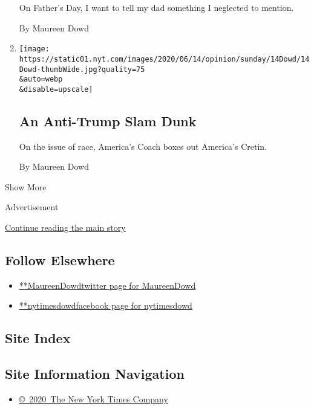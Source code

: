 \begin{enumerate}
  On Father's Day, I want to tell my dad something I neglected to
  mention.

  By Maureen Dowd
\item
  \href{/2020/06/13/opinion/sunday/gregg-popovich-trump-nba-protests.html}{}

  \texttt{[image: https://static01.nyt.com/images/2020/06/14/opinion/sunday/14Dowd/14Dowd-thumbWide.jpg?quality=75\\\&auto=webp\\\&disable=upscale]}

  \hypertarget{an-anti-trump-slam-dunk}{%
  \subsection{An Anti-Trump Slam Dunk}\label{an-anti-trump-slam-dunk}}

  On the issue of race, America's Coach boxes out America's Cretin.

  By Maureen Dowd
\end{enumerate}

Show More

Advertisement

\protect\hyperlink{after-mid2}{Continue reading the main story}

\hypertarget{follow-elsewhere}{%
\subsection{Follow Elsewhere}\label{follow-elsewhere}}

\begin{itemize}
\tightlist
\item
  \href{https://twitter.com/MaureenDowd}{**MaureenDowdtwitter page for
  MaureenDowd}
\item
  \href{https://www.facebook.com/nytimesdowd}{**nytimesdowdfacebook page
  for nytimesdowd}
\end{itemize}

\hypertarget{site-index}{%
\subsection{Site Index}\label{site-index}}

\hypertarget{site-information-navigation}{%
\subsection{Site Information
Navigation}\label{site-information-navigation}}

\begin{itemize}
\tightlist
\item
  \href{https://help.nytimes.com/hc/en-us/articles/115014792127-Copyright-notice}{©~2020~The
  New York Times Company}
\end{itemize}

